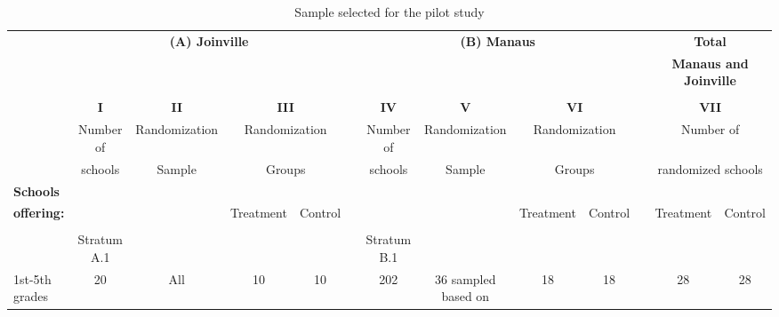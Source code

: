 \documentclass[
	article,			%
	12pt,				%
	oneside,			%
	a4paper,			%
	]{article}
\begin{document}
\begin{landscape}

\begin{table}[htbp]
  \centering
  \fontsize{10}{11}\selectfont
  \begin{threeparttable}
  \caption{Sample selected for the pilot study}
\begin{tabular}{lcccccccccccc}
\hline
           &              \multicolumn{ 4}{c}{{\bf (A) Joinville}} &     {\bf } &                 \multicolumn{ 4}{c}{{\bf (B) Manaus}} &     {\bf } & \multicolumn{ 2}{c}{{\bf Total}} \\

           &     {\bf } &     {\bf } &     {\bf } &     {\bf } &     {\bf } &     {\bf } &     {\bf } &     {\bf } &     {\bf } &     {\bf } & \multicolumn{ 2}{c}{{\bf Manaus and Joinville}} \\

           &     {\bf } &     {\bf } &     {\bf } &     {\bf } &     {\bf } &     {\bf } &     {\bf } &     {\bf } &     {\bf } &     {\bf } &     {\bf } &     {\bf } \\

    {\bf } &    {\bf I} &   {\bf II} & \multicolumn{ 2}{c}{{\bf III}} &     {\bf } &   {\bf IV} &    {\bf V} & \multicolumn{ 2}{c}{{\bf VI}} &     {\bf } & \multicolumn{ 2}{c}{{\bf VII}} \\

           &  Number of & Randomization & \multicolumn{ 2}{c}{Randomization} &            &  Number of & Randomization & \multicolumn{ 2}{c}{Randomization} &            & \multicolumn{ 2}{c}{Number of} \\

           &    schools &     Sample & \multicolumn{ 2}{c}{Groups} &            &    schools &     Sample & \multicolumn{ 2}{c}{Groups} &            & \multicolumn{ 2}{c}{randomized schools} \\

{\bf Schools } &            &            &            &            &            &            &            &            &            &            &            &            \\

{\bf offering: } &     {\bf } &     {\bf } &  Treatment &    Control &            &            &            &  Treatment &    Control &            &  Treatment &    Control \\
\cline{2-5}\cline{7-10}\cline{12-13} 
    {\bf } &     {\bf } &     {\bf } &            &            &            &            &            &            &            &            &            &            \\
  & Stratum A.1           &            &            &            &           &  Stratum B.1  \\
1st-5th grades &         20 &        All &         10 &         10 &            &        202 & 36 sampled based on  &         18 &         18 &            &         28 &         28 \\


\end{tabular}
\end{threeparttable}
\end{table}
\end{landscape}
\end{document}
